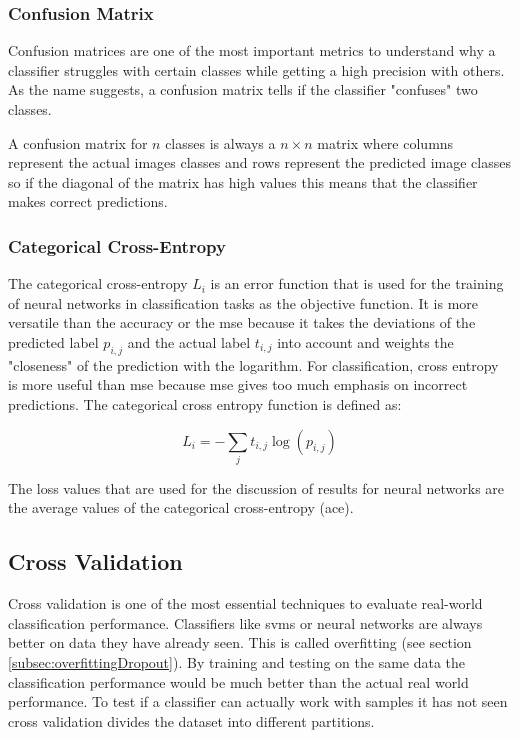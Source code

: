 \subsubsection*{Confusion Matrix}
Confusion matrices are one of the most important metrics to understand why a classifier struggles with certain classes while getting a high precision with others. As the name suggests, a confusion matrix tells if the classifier "confuses" two classes.

A confusion matrix for $n$ classes is always a $n \times n$ matrix where columns represent the actual images classes and rows represent the predicted image classes so if the diagonal of the matrix has high values this means that the classifier makes correct predictions.

\subsubsection*{Categorical Cross-Entropy}
The categorical cross-entropy $L_i$ is an error function that is used for the training of neural networks in classification tasks as the objective function. It is more versatile than the accuracy or the \gls{mse} because it takes the deviations of the predicted label $p_{i,j}$ and the actual label $t_{i,j}$ into account and weights the "closeness" of the prediction with the logarithm. For classification, cross entropy is more useful than \gls{mse} because \gls{mse} gives too much emphasis on incorrect predictions. The categorical cross entropy function is defined as:

\begin{equation}
L_i = - \sum_{j} t_{i,j}\log(p_{i,j})
\end{equation} 

The loss values that are used for the discussion of results for neural networks are the average values of the categorical cross-entropy {(\gls{ace})}.

\subsection{Cross Validation}
Cross validation is one of the most essential techniques to evaluate real-world classification performance. Classifiers like \glspl{svm} or neural networks are always better on data they have already seen. This is called overfitting {(see section \ref{subsec:overfittingDropout})}. By training and testing on the same data the classification performance would be much better than the actual real world performance. To test if a classifier can actually work with samples it has not seen cross validation divides the dataset into different partitions. 

